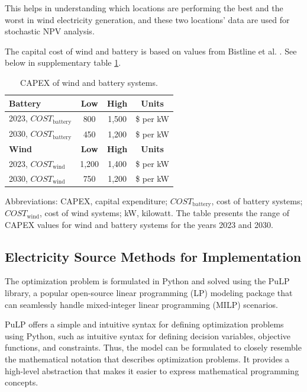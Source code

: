 \documentclass{article}
\begin{document}
This helps in understanding which locations are performing the best and the worst in wind electricity generation, and these two locations’ data are used for stochastic NPV analysis.

The capital cost of wind and battery is based on values from Bistline et al. \cite{Bistline2023}. See below in supplementary table \ref{table:capex_wind_battery}.

\begin{table}[H]
  \centering
  \caption{CAPEX of wind and battery systems.}
  \label{table:capex_wind_battery}
  \begin{tabular}{@{}lccc@{}}
    \toprule
    \textbf{Battery} & \textbf{Low} & \textbf{High} & \textbf{Units} \\ \midrule
    2023, $COST_{\text{battery}}$ & 800 & 1,500 & \$ per kW \\
    2030, $COST_{\text{battery}}$ & 450 & 1,200 & \$ per kW \\ \midrule
    \textbf{Wind} & \textbf{Low} & \textbf{High} & \textbf{Units} \\ \midrule
    2023, $COST_{\text{wind}}$ & 1,200 & 1,400 & \$ per kW \\
    2030, $COST_{\text{wind}}$ & 750 & 1,200 & \$ per kW \\ \bottomrule
  \end{tabular}
  \begin{tablenotes}
  \small
  \item Abbreviations: CAPEX, capital expenditure; $COST_{\text{battery}}$, cost of battery systems; $COST_{\text{wind}}$, cost of wind systems; kW, kilowatt. The table presents the range of CAPEX values for wind and battery systems for the years 2023 and 2030.
\end{tablenotes}

\end{table}

\subsection{Electricity Source Methods for Implementation}

The optimization problem is formulated in Python and solved using the PuLP library, a popular open-source linear programming (LP) modeling package that can seamlessly handle mixed-integer linear programming (MILP) scenarios.

PuLP offers a simple and intuitive syntax for defining optimization problems using Python, such as intuitive syntax for defining decision variables, objective functions, and constraints. Thus, the model can be formulated to closely resemble the mathematical notation that describes optimization problems. It provides a high-level abstraction that makes it easier to express mathematical programming concepts.
\end{document}
